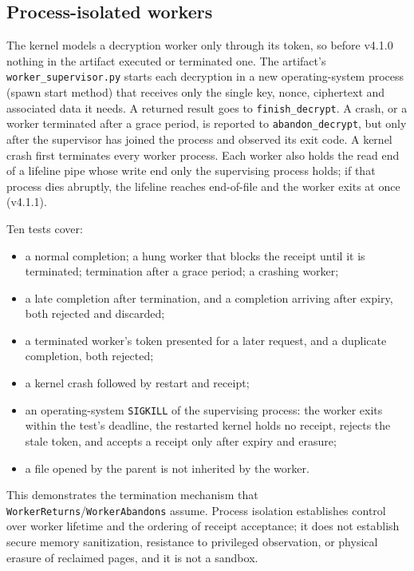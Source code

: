 \documentclass[pdflatex,sn-mathphys-num,twocolumn]{sn-jnl}
\theoremstyle{plain}
\theoremstyle{definition}
\newcommand{\code}[1]{\texttt{#1}}
\begin{document}
\subsection{Process-isolated workers}\label{sec:supervisor}
The kernel models a decryption worker only through its token, so before v4.1.0 nothing in the artifact executed or terminated one. The artifact's \code{worker\_supervisor.py} starts each decryption in a new operating-system process (spawn start method) that receives only the single key, nonce, ciphertext and associated data it needs. A returned result goes to \code{finish\_decrypt}. A crash, or a worker terminated after a grace period, is reported to \code{abandon\_decrypt}, but only after the supervisor has joined the process and observed its exit code. A kernel crash first terminates every worker process. Each worker also holds the read end of a lifeline pipe whose write end only the supervising process holds; if that process dies abruptly, the lifeline reaches end-of-file and the worker exits at once (v4.1.1).

Ten tests cover:
\begin{itemize}
\item a normal completion; a hung worker that blocks the receipt until it is terminated; termination after a grace period; a crashing worker;
\item a late completion after termination, and a completion arriving after expiry, both rejected and discarded;
\item a terminated worker's token presented for a later request, and a duplicate completion, both rejected;
\item a kernel crash followed by restart and receipt;
\item an operating-system \code{SIGKILL} of the supervising process: the worker exits within the test's deadline, the restarted kernel holds no receipt, rejects the stale token, and accepts a receipt only after expiry and erasure;
\item a file opened by the parent is not inherited by the worker.
\end{itemize}
This demonstrates the termination mechanism that \code{WorkerReturns}/\code{WorkerAbandons} assume. Process isolation establishes control over worker lifetime and the ordering of receipt acceptance; it does not establish secure memory sanitization, resistance to privileged observation, or physical erasure of reclaimed pages, and it is not a sandbox.
\end{document}
